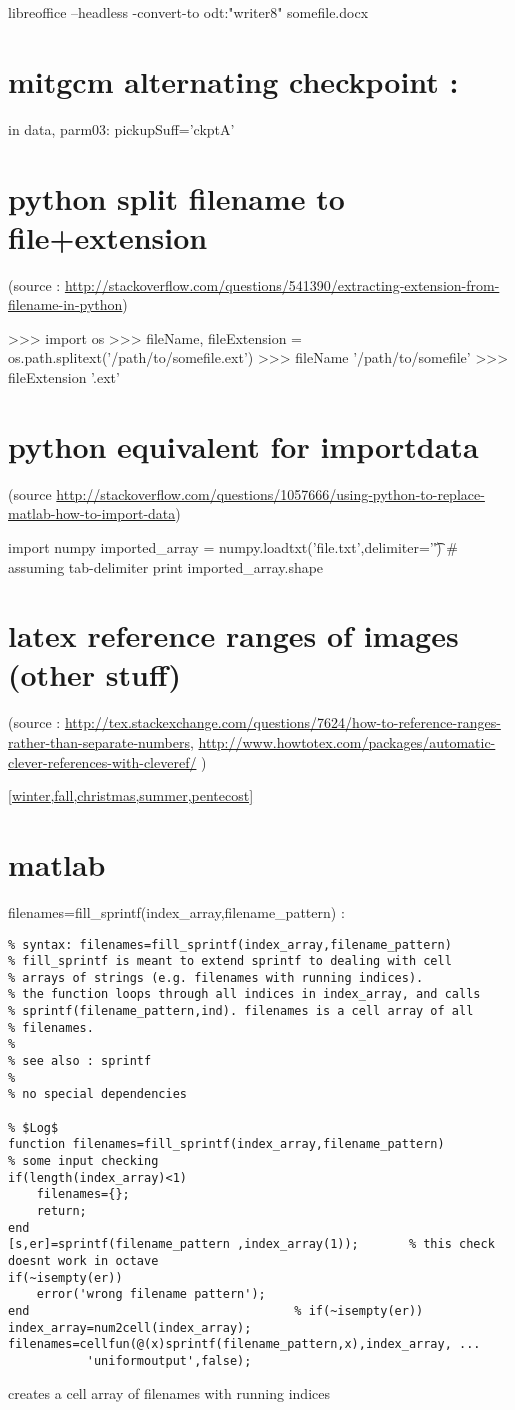 \documentclass[11pt]{article}
\begin{document}
libreoffice --headless -convert-to odt:"writer8" somefile.docx
\section{mitgcm alternating checkpoint :}
\label{sec-10}
in data, parm03:
pickupSuff='ckptA'
\section{python split filename to file+extension}
\label{sec-11}
(source : \url{http://stackoverflow.com/questions/541390/extracting-extension-from-filename-in-python})

>>> import os
>>> fileName, fileExtension = os.path.splitext('/path/to/somefile.ext')
>>> fileName
'/path/to/somefile'
>>> fileExtension
'.ext'
\section{python equivalent for importdata}
\label{sec-12}
(source \url{http://stackoverflow.com/questions/1057666/using-python-to-replace-matlab-how-to-import-data})

import numpy
imported\_array = numpy.loadtxt('file.txt',delimiter='\t')  \# assuming tab-delimiter
print imported\_array.shape
\section{latex reference ranges of images (other stuff)}
\label{sec-13}
(source : \url{http://tex.stackexchange.com/questions/7624/how-to-reference-ranges-rather-than-separate-numbers},
\url{http://www.howtotex.com/packages/automatic-clever-references-with-cleveref/}
)

\usepackage{cleveref}

\cref{winter,fall,christmas,summer,pentecost}

\section{matlab}
\label{sec-14}
filenames=fill\_sprintf(index\_array,filename\_pattern) :
\begin{verbatim}
% syntax: filenames=fill_sprintf(index_array,filename_pattern)
% fill_sprintf is meant to extend sprintf to dealing with cell
% arrays of strings (e.g. filenames with running indices).
% the function loops through all indices in index_array, and calls
% sprintf(filename_pattern,ind). filenames is a cell array of all 
% filenames.
%
% see also : sprintf
%
% no special dependencies

% $Log$
function filenames=fill_sprintf(index_array,filename_pattern)
% some input checking
if(length(index_array)<1)
    filenames={};
    return;
end
[s,er]=sprintf(filename_pattern ,index_array(1));       % this check doesnt work in octave
if(~isempty(er))
    error('wrong filename pattern');
end                                     % if(~isempty(er))
index_array=num2cell(index_array);
filenames=cellfun(@(x)sprintf(filename_pattern,x),index_array, ...
		   'uniformoutput',false);
\end{verbatim}
creates a cell array of filenames with running indices
\end{document}
